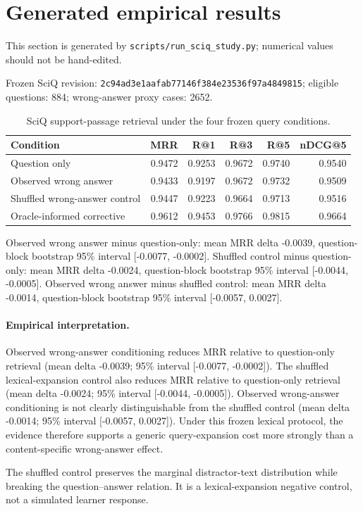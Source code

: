 \section{Generated empirical results}
This section is generated by \texttt{scripts/run\_sciq\_study.py}; numerical values should not be hand-edited.

Frozen SciQ revision: \texttt{2c94ad3e1aafab77146f384e23536f97a4849815}; eligible questions: 884; wrong-answer proxy cases: 2652.

\begin{table}[htbp]
\centering
\small
\begin{tabular}{lrrrrr}
\toprule
Condition & MRR & R@1 & R@3 & R@5 & nDCG@5 \\
\midrule
Question only & 0.9472 & 0.9253 & 0.9672 & 0.9740 & 0.9540 \\
Observed wrong answer & 0.9433 & 0.9197 & 0.9672 & 0.9732 & 0.9509 \\
Shuffled wrong-answer control & 0.9447 & 0.9223 & 0.9664 & 0.9713 & 0.9516 \\
Oracle-informed corrective & 0.9612 & 0.9453 & 0.9766 & 0.9815 & 0.9664 \\
\bottomrule
\end{tabular}
\caption{SciQ support-passage retrieval under the four frozen query conditions.}
\end{table}

Observed wrong answer minus question-only: mean MRR delta -0.0039, question-block bootstrap 95\% interval [-0.0077, -0.0002].
Shuffled control minus question-only: mean MRR delta -0.0024, question-block bootstrap 95\% interval [-0.0044, -0.0005].
Observed wrong answer minus shuffled control: mean MRR delta -0.0014, question-block bootstrap 95\% interval [-0.0057, 0.0027].

\paragraph{Empirical interpretation.}
Observed wrong-answer conditioning reduces MRR relative to question-only retrieval (mean delta -0.0039; 95\% interval [-0.0077, -0.0002]).
The shuffled lexical-expansion control also reduces MRR relative to question-only retrieval (mean delta -0.0024; 95\% interval [-0.0044, -0.0005]).
Observed wrong-answer conditioning is not clearly distinguishable from the shuffled control (mean delta -0.0014; 95\% interval [-0.0057, 0.0027]). Under this frozen lexical protocol, the evidence therefore supports a generic query-expansion cost more strongly than a content-specific wrong-answer effect.

The shuffled control preserves the marginal distractor-text distribution while breaking the question--answer relation. It is a lexical-expansion negative control, not a simulated learner response.
